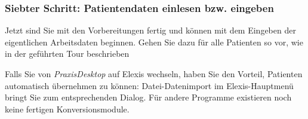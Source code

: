 \subsubsection{Siebter Schritt: Patientendaten einlesen bzw. eingeben}
Jetzt sind Sie mit den Vorbereitungen fertig und können mit dem Eingeben der eigentlichen Arbeitsdaten beginnen. Gehen Sie dazu für alle Patienten so vor, wie in der geführten Tour beschrieben

 Falls Sie von \textit{PraxisDesktop} auf Elexis wechseln, haben Sie den Vorteil, Patienten automatisch übernehmen zu können: Datei-Datenimport im Elexis-Hauptmenü bringt Sie zum entsprechenden Dialog. Für andere Programme existieren noch keine fertigen Konversionsmodule.

